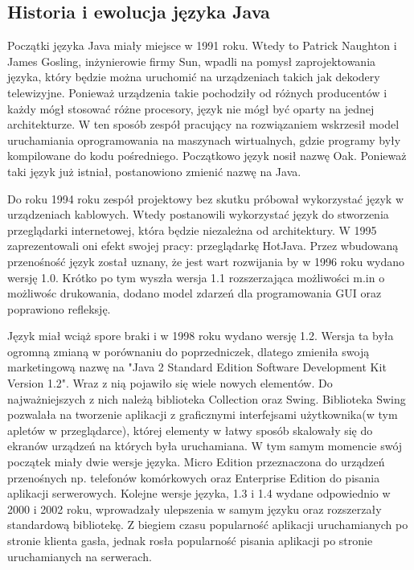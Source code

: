 \subsection{Historia i ewolucja języka Java}
Początki języka Java miały miejsce w 1991 roku. Wtedy to Patrick Naughton i James Gosling, inżynierowie firmy Sun,  wpadli na pomysł zaprojektowania języka, który będzie można uruchomić na urządzeniach takich jak dekodery telewizyjne\cite{java8}. Ponieważ urządzenia takie pochodziły od różnych producentów i każdy mógł stosować różne procesory, język nie mógł być oparty na jednej architekturze. W ten sposób zespół pracujący na rozwiązaniem wskrzesił model uruchamiania oprogramowania na maszynach wirtualnych, gdzie programy były kompilowane do kodu pośredniego.  
Początkowo język nosił nazwę Oak. Ponieważ taki język już istniał, postanowiono zmienić nazwę na Java.

Do roku 1994 roku zespół projektowy bez skutku próbował wykorzystać język w urządzeniach kablowych. Wtedy postanowili wykorzystać język do stworzenia przeglądarki internetowej, która będzie niezależna od architektury. W 1995 zaprezentowali oni efekt swojej pracy: przeglądarkę HotJava. Przez wbudowaną przenośność język został uznany, że jest wart rozwijania by w 1996 roku wydano wersję 1.0. Krótko po tym wyszła wersja 1.1 rozszerzająca możliwości m.in o możliwośc drukowania, dodano model zdarzeń dla programowania GUI oraz poprawiono refleksję.

Język miał wciąż spore braki i w 1998 roku wydano wersję 1.2. Wersja ta była ogromną zmianą w porównaniu do poprzedniczek, dlatego zmieniła swoją marketingową nazwę na "Java 2 Standard Edition Software Development Kit Version 1.2". Wraz z nią pojawiło się wiele nowych elementów. Do najważniejszych z nich należą biblioteka Collection oraz Swing. Biblioteka Swing pozwalała na tworzenie aplikacji z graficznymi interfejsami użytkownika(w tym apletów w przeglądarce), której elementy w łatwy sposób skalowały się do ekranów urządzeń na których była uruchamiana. W tym samym momencie swój początek miały dwie wersje języka. Micro Edition przeznaczona do urządzeń przenośnych np. telefonów komórkowych oraz Enterprise Edition do pisania aplikacji serwerowych. Kolejne wersje języka, 1.3 i 1.4 wydane odpowiednio w 2000 i 2002 roku, wprowadzały ulepszenia w samym języku oraz rozszerzały standardową bibliotekę. Z biegiem czasu popularność aplikacji uruchamianych po stronie klienta gasła, jednak rosła popularność pisania aplikacji po stronie uruchamianych na serwerach.

